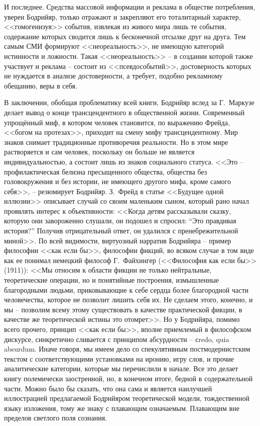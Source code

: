 И последнее. Средства массовой информации и реклама в обществе потребления,
уверен Бодрийяр, только отражают и закрепляют его тоталитарный характер, <<гомогенизуя>>
события, извлекая из живого мира лишь те события, содержание которых сводится лишь
к бесконечной отсылке друг на друга. Тем самым СМИ формируют <<неореальность>>,
не имеющую категорий истинности и ложности. Такая <<неореальность>> -- в создании
которой также участвует и реклама -- состоит из <<псевдособытий>>, достоверность
которых не нуждается в анализе достоверности, а требует, подобно рекламному обещанию,
веры в себя. \autocite[][150--166]{bodriyar_society}

В заключении, обобщая проблематику всей книги, Бодрийяр вслед за Г.~Маркузе делает
вывод о конце трансцендентного в общественной жизни. Современный упрощённый миф,
в котором человек становится, по выражению Фрейда, <<богом на протезах>>,
приходит на смену мифу трансцендентному. Мир знаков снимает традиционные противоречия
реальности. Но в этом мире растворяется и сам человек, поскольку он больше не
является индивидуальностью, а состоит лишь из знаков социального статуса.
<<Это -- профилактическая белизна пресыщенного общества, общества без головокружения
и без истории, не имеющего другого мифа, кроме самого себя>>, -- резюмирует Бодрийяр.
\autocite[][245]{bodriyar_society}\autocite{kara2000}
З.~Фрейд в статье <<Будущее одной иллюзии>> описывает случай со своим маленьким
сыном, который рано начал проявлять интерес к объективности: <<Когда детям
рассказывали сказку, которую они завороженно слушали, он подошел и спросил:
``Это правдивая история?'' Получив отрицательный ответ, он удалился с пренебрежительной
миной>>.\autocite[][40]{freud1992} По всей видимости, виртуозный нарратив Бодрийяра --
пример философии <<как если бы>>, философии фикций, во всяком случае в том виде
как ее понимал немецкий философ Г.~Файхингер (<<Философия как если бы>> (1911)):
<<Мы относим к области фикции не только нейтральные, теоретические операции, но
и понятийные построения, измышленные благородными людьми, приковывающие к себе
сердца более благородной части человечества, которое не позволит лишить себя их.
Не сделаем этого, конечно, и мы -- позволим всему этому существовать в качестве
практической фикции, в качестве же теоретической истины это отомрет>>.\autocite{freud1992}
Но у Бодрийяра, помимо всего прочего, принцип <<как если бы>>,
вполне приемлемый в философском дискурсе, синкретично сливается с принципом
абсурдности -- сredo, quia absurdum. Иначе говоря, мы имеем дело со спекулятивным
постмодернистским текстом с соответствующими установками на иронию,
игру слов, и прочие аналитические категории, которые мы перечислили в начале.
Все это делает книгу полемически заостренной, но, в конечном итоге, бедной в
содержательной части. Можно было бы сказать, что она сама и является наилучшей
иллюстрацией предлагаемой Бодрийяром теоретической модели, тождественной языку
изложения, тому же знаку с плавающим означаемым. Плавающим вне пределов светлого
поля сознания.

